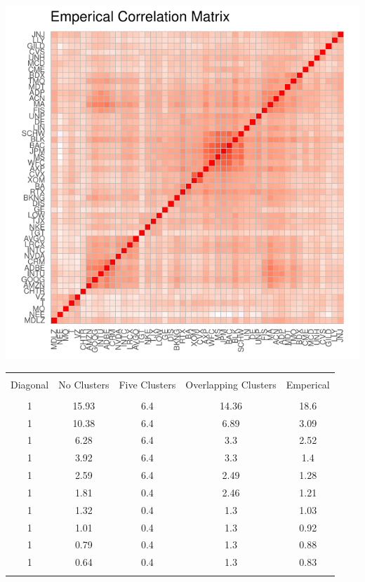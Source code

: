 \documentclass[11pt,preprint, authoryear]{elsarticle}
\let\origfigure\figure
\let\endorigfigure\endfigure
\renewenvironment{figure}[1][2] {
    \expandafter\origfigure\expandafter[H]
} {
    \endorigfigure
}
\let\origtable\table
\let\endorigtable\endtable
\renewenvironment{table}[1][2] {
    \expandafter\origtable\expandafter[H]
} {
    \endorigtable
}
\numberwithin{equation}{section}
\numberwithin{figure}{section}
\numberwithin{table}{section}
\begin{document}
\begin{figure}
\centering
\includegraphics{Thesis_files/figure-latex/unnamed-chunk-1-1.pdf}
\caption{\label{corr_emp} Emperical Correlation Matrix}
\end{figure}

\begin{table}[!htbp] \centering 
  \caption{Eigenvalues} 
  \label{eigens} 
\begin{tabular}{@{\extracolsep{5pt}} ccccc} 
\\[-1.8ex]\hline 
\hline \\[-1.8ex] 
Diagonal & No Clusters & Five Clusters & Overlapping Clusters & Emperical \\ 
\hline \\[-1.8ex] 
1 & 15.93 & 6.4 & 14.36 & 18.6 \\ 
1 & 10.38 & 6.4 & 6.89 & 3.09 \\ 
1 & 6.28 & 6.4 & 3.3 & 2.52 \\ 
1 & 3.92 & 6.4 & 3.3 & 1.4 \\ 
1 & 2.59 & 6.4 & 2.49 & 1.28 \\ 
1 & 1.81 & 0.4 & 2.46 & 1.21 \\ 
1 & 1.32 & 0.4 & 1.3 & 1.03 \\ 
1 & 1.01 & 0.4 & 1.3 & 0.92 \\ 
1 & 0.79 & 0.4 & 1.3 & 0.88 \\ 
1 & 0.64 & 0.4 & 1.3 & 0.83 \\ 
\hline \\[-1.8ex] 
\end{tabular} 
\end{table}
\end{document}
